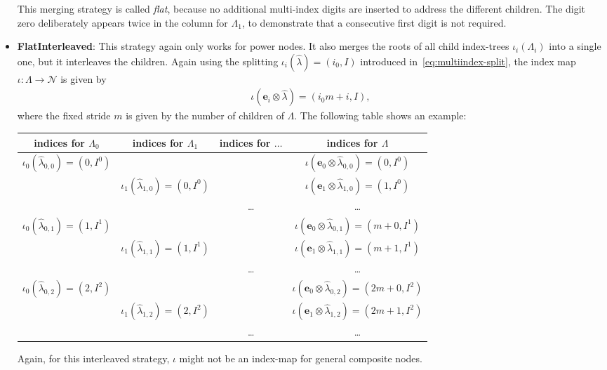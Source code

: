 \documentclass[a4paper,10pt,headings=normal,bibliography=totoc]{scrartcl}
\begin{document}
\begin{itemize}
    This merging strategy is called \emph{flat}, because no
    additional multi-index digits are inserted to address the different children.
    The digit zero deliberately appears twice in the column for $\Lambda_1$, to demonstrate
    that a consecutive first digit is not required.

  \item \textbf{FlatInterleaved}: This strategy again only works for power nodes.
    It also merges
    the roots of all child index-trees $\iota_i(\Lambda_i)$
    into a single one, but it interleaves the children.
    Again using the splitting
    $\iota_i(\hat{\lambda}) = (i_0,I)$ introduced in~\eqref{eq:multiindex-split},
    the index map $\iota:\Lambda \to \mathcal{N}$ is given by
    \begin{align*}
      \iota(\mathbf{e}_i \otimes\hat{\lambda}) = (i_0 m + i, I),
    \end{align*}
    where the fixed stride $m$ is given by the number of children of $\Lambda$.
    The following table shows an example:

    \begin{tabular}{c|c|c|c}
      indices for $\Lambda_0$ &
      indices for $\Lambda_1$ &
      indices for $\dots$ &
      indices for $\Lambda$ \\
      \hline
      $\iota_0(\hat{\lambda}_{0,0}) = (0,I^0)$ & & &
        $\iota(\mathbf{e}_0 \otimes \hat{\lambda}_{0,0}) = (0,I^0)$ \\
      & $\iota_1(\hat{\lambda}_{1,0}) = (0,I^0)$ & &
        $\iota(\mathbf{e}_1 \otimes \hat{\lambda}_{1,0}) = (1,I^0)$ \\
      & & \dots &
        \dots \\
      $\iota_0(\hat{\lambda}_{0,1}) = (1,I^1)$ & & &
        $\iota(\mathbf{e}_0 \otimes \hat{\lambda}_{0,1}) = (m+0,I^1)$ \\
      & $\iota_1(\hat{\lambda}_{1,1}) = (1,I^1)$ & &
        $\iota(\mathbf{e}_1 \otimes \hat{\lambda}_{1,1}) = (m+1,I^1)$ \\
      & & \dots &
        \dots \\
      $\iota_0(\hat{\lambda}_{0,2}) = (2,I^2)$ & & &
        $\iota(\mathbf{e}_0 \otimes \hat{\lambda}_{0,2}) = (2m+0,I^2)$ \\
      & $\iota_1(\hat{\lambda}_{1,2}) = (2,I^2)$ & &
        $\iota(\mathbf{e}_1 \otimes \hat{\lambda}_{1,2}) = (2m+1,I^2)$ \\
      & & \dots &
        \dots \\
    \end{tabular}

    Again, for this interleaved strategy, $\iota$ might not be an
    index-map for general composite nodes.
\end{itemize}
\end{document}
